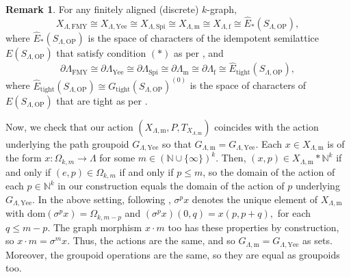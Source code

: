 \documentclass[11pt]{amsart}
\theoremstyle{definition}
\numberwithin{thm}{section}
\numberwithin{equation}{section}
\newtheorem{remark}[thm]{Remark}
\newcommand{\N}{\mathbb{N}}
\newcommand{\morphdom}[1]{\mathrm{dom}(#1)}
\newcommand{\ofFMY}{\mathrm{FMY}}
\newcommand{\ofYeend}{\mathrm{Yee}}
\newcommand{\ofSpielberg}{\mathrm{Spi}}
\newcommand{\ofOP}{\mathrm{OP}}
\newcommand{\M}{\mathrm{m}}
\newcommand{\F}{\mathrm{f}}
\newcommand{\PS}[2]{X_{#2, #1}}
\newcommand{\PG}[2]{{G_{#2, #1}}}
\newcommand{\BPS}[2]{\partial{#2}_{#1}}
\newcommand{\tightgpd}{G_\mathrm{tight}}
\newcommand{\RPA}[2]{#1 \cdot #2}
\newcommand{\unitspace}[1]{#1^{(0)}}
\begin{document}
\begin{remark}
\label{rem:space_homeos_for_kgraphs}
For any finitely aligned (discrete) $k$-graph, 
\[
\PS{\ofFMY}{\Lambda}
\cong \PS{\ofYeend}{\Lambda}
\cong \PS{\ofSpielberg}{\Lambda}
\cong \PS{\M}{\Lambda} 
\cong \PS{\F}{\Lambda}
\cong \hat{E}_*(S_{\Lambda, \ofOP}),
\]
where $\hat{E}_*(S_{\Lambda, \ofOP})$ is the space of characters of the idempotent semilattice $E(S_{\Lambda, \ofOP})$ that satisfy condition $(*)$ as per \cite[Definition 3.15 and Corollary 3.16]{OP20}, and
\[
\BPS{\ofFMY}{\Lambda}
\cong \BPS{\ofYeend}{\Lambda}
\cong \BPS{\ofSpielberg}{\Lambda}
\cong \BPS{\M}{\Lambda} 
\cong \BPS{\F}{\Lambda}
\cong \hat{E}_\mathrm{tight}(S_{\Lambda, \ofOP}),
\]
where $\hat{E}_\mathrm{tight}(S_{\Lambda, \ofOP}) \cong \unitspace{\tightgpd(S_{\Lambda, \ofOP})}$ is the space of characters of $E(S_{\Lambda, \ofOP})$ that are tight as per \cite[Definition 12.8]{Exe08}.
\end{remark}

Now, we check that our action $(\PS{\M}{\Lambda}, P, T_{\PS{\M}{\Lambda}})$ coincides with the action underlying the path groupoid $\PG{\ofYeend}{\Lambda}$ so that $\PG{\M}{\Lambda} = \PG{\ofYeend}{\Lambda}$.
Each $x \in \PS{\M}{\Lambda}$ is of the form $x \colon \Omega_{k, m} \to \Lambda$ for some $m \in (\N \cup \{\infty\})^k$.
Then, $(x, p) \in \PS{\M}{\Lambda} * \N^k$ if and only if $(e, p) \in \Omega_{k, m}$ if and only if $p \leq m$, so the domain of the action of each $p \in \N^k$ in our construction equals the domain of the action of $p$ underlying $\PG{\ofYeend}{\Lambda}$.
In the above setting, following \cite[Lemma 3.3]{Yee07}, $\sigma^p x$ denotes the unique element of $\PS{\M}{\Lambda}$ with $\morphdom{\sigma^p x} = \Omega_{k, m - p}$ and 
\(
(\sigma^p x)(0, q) 
= x(p, p + q),
\)
for each $q \leq m - p$. 
The graph morphism $\RPA{x}{m}$ too has these properties by construction, so $\RPA{x}{m} = \sigma^m x$.
Thus, the actions are the same, and so $\PG{\M}{\Lambda} = \PG{\ofYeend}{\Lambda}$ as sets.
Moreover, the groupoid operations are the same, so they are equal as groupoids too.
\end{document}
